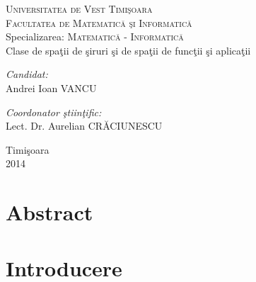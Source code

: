 \documentclass[ a4paper, 12pt]{report}
\theoremstyle{definition}
\theoremstyle{remark}
\numberwithin{equation}{section}
\begin{document}
\newpage
\pagestyle{plain}
\begin{titlepage}
\begin{center}
\textsc{\large Universitatea de Vest Timi\c soara}\\[0.5cm]
\textsc{\large Facultatea de Matematic\u a \c si Informatic\u a}\\[0.5cm]
\vspace{15mm}
Specializarea: \textsc{\large Matematic\u{a} - Informatic\u a}\\[1cm]
\vspace{20mm}
{\huge Clase de spa\c tii de
\c siruri  \c si de spa\c tii de
func\c tii \c si aplica\c tii }\\[0.2cm]
\vspace{20mm}
\begin{minipage}{\textwidth}
\begin{flushleft} \large
\emph{Candidat:}\\
Andrei Ioan VANCU \\[0.3cm]
\end{flushleft}
\vspace{10mm}
\begin{flushright}\large
\emph{Coordonator \c stiin\c tific:}\\
Lect. Dr. Aurelian CR\u ACIUNESCU
\end{flushright}
\end{minipage}
\newline
\vspace{10mm}
\begin{minipage}{\textwidth}
\end{minipage}
\vspace{20mm}
\newline
{\large Timi\c soara }\\
{\large 2014}
\end{center}
\end{titlepage}
\newpage
\sloppy
{\large\tableofcontents}
\vspace{15 mm }



\newpage
\section*{Abstract}
\newpage
\section*{Introducere}
\vspace{10 mm}
\end{document}
